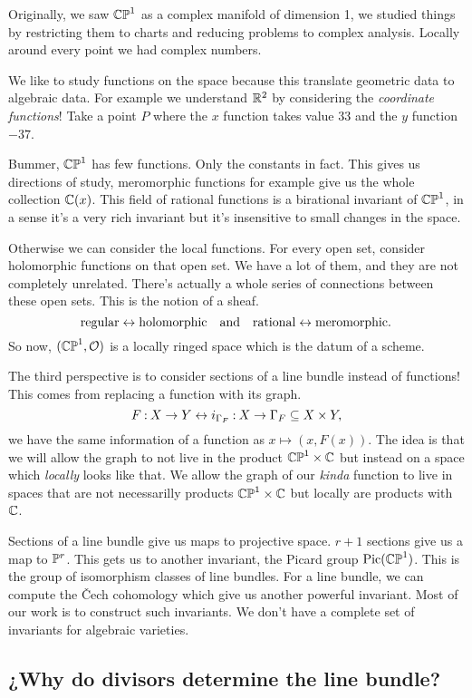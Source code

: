 \documentclass[12pt]{memoir}
\begin{document}
Originally, we saw $\mathbb{CP}^1$ as a complex manifold of dimension 1, we studied things by restricting them to charts and reducing problems to complex analysis. Locally around every point we had complex numbers.\par
We like to study functions on the space because this translate geometric data to algebraic data. For example we understand $\mathbb{R}^2$ by considering the \emph{coordinate functions}! Take a point $P$ where the $x$ function takes value $33$ and the $y$ function $-37$.\par
Bummer, $\mathbb{CP}^1$ has few functions. Only the constants in fact. This gives us directions of study, meromorphic functions for example give us the whole collection $\mathbb{C}(x)$. This field of rational functions is a birational invariant of $\mathbb{CP}^1$, in a sense it's a very rich invariant but it's insensitive to small changes in the space.\par
Otherwise we can consider the local functions. For every open set, consider holomorphic functions on that open set. We have a lot of them, and they are not completely unrelated. There's actually a whole series of connections between these open sets. This is the notion of a sheaf. 
$$\text{regular}\leftrightarrow\text{holomorphic}\quad\text{and}\quad\text{rational}\leftrightarrow\text{meromorphic}.$$
So now, $(\mathbb{CP}^1,\mathcal{O})$ is a locally ringed space which is the datum of a scheme.\par
The third perspective is to consider sections of a line bundle instead of functions! This comes from replacing a function with its graph.
$$F\mathbin{:}X\to Y\leftrightarrow i_{\Gamma_F}\mathbin{:} X\to\Gamma_F\subseteq X\times Y,$$
we have the same information of a function as $x\mapsto(x,F(x))$. The idea is that we will allow the graph to not live in the product $\mathbb{CP}^1\times\mathbb{C}$ but instead on a space which \emph{locally} looks like that. We allow the graph of our \emph{kinda} function to live in spaces that are not necessarilly products $\mathbb{CP}^1\times\mathbb{C}$ but locally are products with $\mathbb{C}$.\par
Sections of a line bundle give us maps to projective space. $r+1$ sections give us a map to $\mathbb{P}^r$. This gets us to another invariant, the Picard group $\operatorname{Pic}(\mathbb{CP}^1)$. This is the group of isomorphism classes of line bundles. For a line bundle, we can compute the \v{C}ech cohomology which give us another powerful invariant. Most of our work is to construct such invariants. We don't have a complete set of invariants for algebraic varieties.

\subsection{¿Why do divisors determine the line bundle?}
\end{document}
